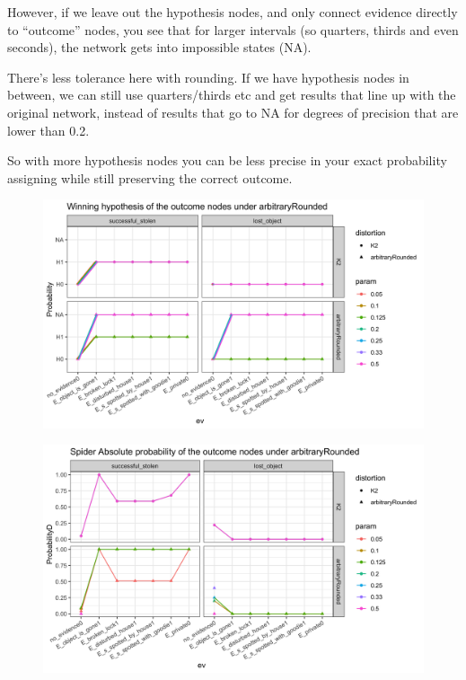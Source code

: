 \documentclass[11pt]{amsart}
\begin{document}
However, if we leave out the hypothesis nodes, and only connect evidence directly to ``outcome'' nodes, you see that for larger intervals (so quarters, thirds and even seconds), the network gets into impossible states (NA). 

There's less tolerance here with rounding. If we have hypothesis nodes in between, we can still use quarters/thirds etc and get results that line up with the original network, instead of results that go to NA for degrees of precision that are lower than 0.2.

So with more hypothesis nodes you can be less precise in your exact probability assigning while still preserving the correct outcome.

\begin{figure}[htbp]
\begin{center}
\includegraphics[scale=0.17]{images/arbitraryRoundedWeakSpider.png}
\label{default}
\end{center}
\end{figure}

\begin{figure}[htbp]
\begin{center}
\includegraphics[scale=0.17]{images/strongarbitraryRoundedspider.png}
\label{default}
\end{center}
\end{figure}
\end{document}
